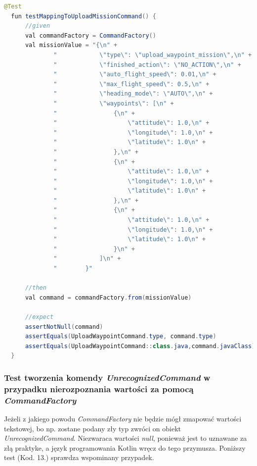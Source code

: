 \begin{lstlisting}[language=Java, caption=Test tworzenia komendy \textit{UploadWaypointCommand}]
  @Test
  fun testMappingToUploadMissionCommand() {
      //given
      val commandFactory = CommandFactory()
      val missionValue = "{\n" +
              "            \"type\": \"upload_waypoint_mission\",\n" +
              "            \"finished_action\": \"NO_ACTION\",\n" +
              "            \"auto_flight_speed\": 0.01,\n" +
              "            \"max_flight_speed\": 0.5,\n" +
              "            \"heading_mode\": \"AUTO\",\n" +
              "            \"waypoints\": [\n" +
              "                {\n" +
              "                    \"attitude\": 1.0,\n" +
              "                    \"longitude\": 1.0,\n" +
              "                    \"latitude\": 1.0\n" +
              "                },\n" +
              "                {\n" +
              "                    \"attitude\": 1.0,\n" +
              "                    \"longitude\": 1.0,\n" +
              "                    \"latitude\": 1.0\n" +
              "                },\n" +
              "                {\n" +
              "                    \"attitude\": 1.0,\n" +
              "                    \"longitude\": 1.0,\n" +
              "                    \"latitude\": 1.0\n" +
              "                }\n" +
              "            ]\n" +
              "        }"

      //then
      val command = commandFactory.from(missionValue)

      //expect
      assertNotNull(command)
      assertEquals(UploadWaypointCommand.type, command.type)
      assertEquals(UploadWaypointCommand::class.java,command.javaClass)
  }
\end{lstlisting}

\subsubsection{Test tworzenia komendy \textit{UnrecognizedCommand} w przypadku nierozpoznania wartości za pomocą \textit{CommandFactory}}
Jeżeli z jakiego powodu \textit{CommandFactory} nie będzie mógł zmapować wartości tekstowej, bo np. zostane podany zły typ zwróci on obiekt \textit{UnrecognizedCommand}. Niezwaraca wartości \textit{null}, ponieważ jest to uznawane za złą praktyke, a język programowania Kotlin wręcz do tego przymusza. Poniższy test (Kod. 13.) sprawdza wspominany przypadek.

